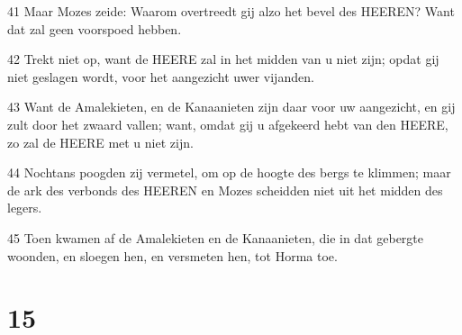 \par 41 Maar Mozes zeide: Waarom overtreedt gij alzo het bevel des HEEREN? Want dat zal geen voorspoed hebben.
\par 42 Trekt niet op, want de HEERE zal in het midden van u niet zijn; opdat gij niet geslagen wordt, voor het aangezicht uwer vijanden.
\par 43 Want de Amalekieten, en de Kanaanieten zijn daar voor uw aangezicht, en gij zult door het zwaard vallen; want, omdat gij u afgekeerd hebt van den HEERE, zo zal de HEERE met u niet zijn.
\par 44 Nochtans poogden zij vermetel, om op de hoogte des bergs te klimmen; maar de ark des verbonds des HEEREN en Mozes scheidden niet uit het midden des legers.
\par 45 Toen kwamen af de Amalekieten en de Kanaanieten, die in dat gebergte woonden, en sloegen hen, en versmeten hen, tot Horma toe.

\chapter{15}


